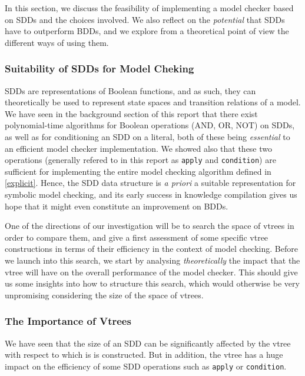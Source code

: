 \documentclass[11pt]{article}
\begin{document}
In this section, we discuss the feasibility of implementing a model checker based on SDDs and the choices involved. We also reflect on the \textit{potential }that SDDs have to outperform BDDs, and we explore from a theoretical point of view the different ways of using them.

\subsubsection{Suitability of SDDs for Model Cheking}

SDDs are representations of Boolean functions, and as such, they can theoretically be used to represent state spaces and transition relations of a model. We have seen in the background section of this report that there exist polynomial-time algorithms for Boolean operations (AND, OR, NOT) on SDDs, as well as for conditioning an SDD on a literal, both of these being \textit{essential} to an efficient model checker implementation. We showed also that these two operations (generally refered to in this report as \texttt{apply} and \texttt{condition}) are sufficient for implementing the entire model checking algorithm defined in \ref{explicit}. Hence, the SDD data structure is \textit{a priori} a suitable representation for symbolic model checking, and its early success \cite{sdd_3} in knowledge compilation gives us hope that it might even constitute an improvement on BDDs. 

One of the directions of our investigation will be to search the space of vtrees in order to compare them, and give a first assessment of some specific vtree constructions in terms of their efficiency in the context of model checking. Before we launch into this search, we start by analysing \textit{theoretically} the impact that the vtree will have on the overall performance of the model checker. This should give us some insights into how to structure this search, which would otherwise be very unpromising considering the size of the space of vtrees.

\subsubsection{The Importance of Vtrees} 

We have seen that the size of an SDD can be significantly affected by the vtree with respect to which is is constructed. But in addition, the vtree has a huge impact on the efficiency of some SDD operations such as \texttt{apply} or \texttt{condition}. 
\end{document}
